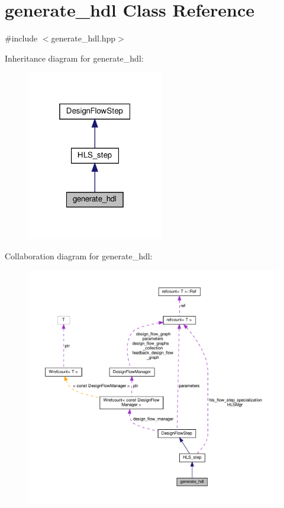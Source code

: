 \hypertarget{classgenerate__hdl}{}\section{generate\+\_\+hdl Class Reference}
\label{classgenerate__hdl}


{\ttfamily \#include $<$generate\+\_\+hdl.\+hpp$>$}



Inheritance diagram for generate\+\_\+hdl\+:
\nopagebreak
\begin{figure}[H]
\begin{center}
\leavevmode
\includegraphics[width=169pt]{dd/d9c/classgenerate__hdl__inherit__graph}
\end{center}
\end{figure}


Collaboration diagram for generate\+\_\+hdl\+:
\nopagebreak
\begin{figure}[H]
\begin{center}
\leavevmode
\includegraphics[width=350pt]{d9/d1c/classgenerate__hdl__coll__graph}
\end{center}
\end{figure}
